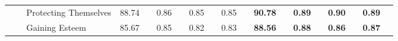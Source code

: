 \begin{table}[!tbh]
{\begin{tabular}{l|l|l|llllllll||llllllll}
                                                                                               &                                  & Protecting Themselves    & \multicolumn{1}{l|}{88.74} & \multicolumn{1}{l|}{}                        & \multicolumn{1}{l|}{0.86} & \multicolumn{1}{l|}{}                       & \multicolumn{1}{l|}{0.85} & \multicolumn{1}{l|}{}                       & \multicolumn{1}{l|}{0.85} &                        & \multicolumn{1}{l|}{\cellcolor[HTML]{FFFE65}\textbf{90.78}} & \multicolumn{1}{l|}{\cellcolor[HTML]{FFFE65}}                                 & \multicolumn{1}{l|}{\cellcolor[HTML]{FFFE65}\textbf{0.89}} & \multicolumn{1}{l|}{\cellcolor[HTML]{FFFE65}}                                & \multicolumn{1}{l|}{\cellcolor[HTML]{FFFE65}\textbf{0.90}} & \multicolumn{1}{l|}{\cellcolor[HTML]{FFFE65}}                                & \multicolumn{1}{l|}{\cellcolor[HTML]{FFFE65}\textbf{0.89}} & \cellcolor[HTML]{FFFE65}                                \\ \cline{3-4} \cline{6-6} \cline{8-8} \cline{10-10} \cline{12-12} \cline{14-14} \cline{16-16} \cline{18-18}
                                                                                               &                                  & Gaining Esteem           & \multicolumn{1}{l|}{85.67} & \multicolumn{1}{l|}{}                        & \multicolumn{1}{l|}{0.85} & \multicolumn{1}{l|}{}                       & \multicolumn{1}{l|}{0.82} & \multicolumn{1}{l|}{}                       & \multicolumn{1}{l|}{0.83} &                        & \multicolumn{1}{l|}{\cellcolor[HTML]{FFFE65}\textbf{88.56}} & \multicolumn{1}{l|}{\cellcolor[HTML]{FFFE65}}                                 & \multicolumn{1}{l|}{\cellcolor[HTML]{FFFE65}\textbf{0.88}} & \multicolumn{1}{l|}{\cellcolor[HTML]{FFFE65}}                                & \multicolumn{1}{l|}{\cellcolor[HTML]{FFFE65}\textbf{0.86}} & \multicolumn{1}{l|}{\cellcolor[HTML]{FFFE65}}                                & \multicolumn{1}{l|}{\cellcolor[HTML]{FFFE65}\textbf{0.87}} & \cellcolor[HTML]{FFFE65}                                \\ \cline{3-4} \cline{6-6} \cline{8-8} \cline{10-10} \cline{12-12} \cline{14-14} \cline{16-16} \cline{18-18}

\end{tabular}}
\end{table}
